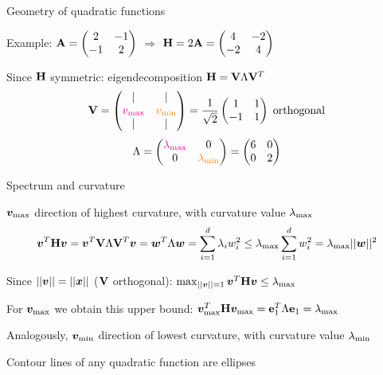 \documentclass[11pt,compress,t,notes=noshow, xcolor=table]{beamer}
\begin{document}
\begin{framei}{Geometry of quadratic functions}
\item Example: $\mathbf{A} = \begin{pmatrix} 2 & -1 \\ -1 & 2\end{pmatrix}$ $\Rightarrow$ $\mathbf{H} = 2\mathbf{A} = \begin{pmatrix} 4 & -2 \\ -2 & 4\end{pmatrix}$
\item Since $\mathbf{H}$ symmetric: eigendecomposition $\mathbf{H} = \mathbf{V}\Lambda\mathbf{V}^T$
\begin{equation*}
\mathbf{V} = \begin{pmatrix}
| & | \\
\textcolor{magenta}{v_\text{max}} & \textcolor{orange}{v_\text{min}} \\
| & |
\end{pmatrix}
= \frac{1}{\sqrt{2}} \begin{pmatrix}
1 & 1 \\
-1 & 1
\end{pmatrix}\;\text{orthogonal}
\end{equation*}
\begin{equation*}
\Lambda = \begin{pmatrix}
\textcolor{magenta}{\lambda_\text{max}} & 0 \\
0 & \textcolor{orange}{\lambda_\text{min}}
\end{pmatrix}
= \begin{pmatrix}6 & 0 \\ 0 & 2\end{pmatrix}
\end{equation*}
\end{framei}


\begin{framei}[fs=footnotesize]{Spectrum and curvature}
\item $\bm{v}_\text{max}$ direction of highest curvature, with curvature value $\lambda_\text{max}$
$$
\bm{v}^T \mathbf{H} \bm{v} = \bm{v}^T \mathbf{V} \Lambda \mathbf{V}^T \bm{v} = \bm{w}^T \Lambda \bm{w} =
\sum\limits_{i=1}^d \lambda_i w_i^2 \le \lambda_\text{max} \sum\limits_{i=1}^d w_i^2 = \lambda_\text{max} || \bm{w} ||^2
$$
\item Since $|| \bm{v} || = || \bm{x} ||$ ($\mathbf{V}$ orthogonal):
$\max_{|| \bm{v} || = 1} \bm{v}^T \mathbf{H} \bm{v} \le \lambda_\text{max}$
\item For $\bm{v}_\text{max}$ we obtain this upper bound:
$\bm{v}_\text{max}^T \mathbf{H} \bm{v}_\text{max} = \mathbf{e}_1^T \Lambda \mathbf{e}_1 = \lambda_\text{max}$
\item Analogously, $\bm{v}_\text{min}$ direction of lowest curvature, with curvature value $\lambda_\text{min}$
\item Contour lines of any quadratic function are ellipses
\end{framei}
\end{document}
